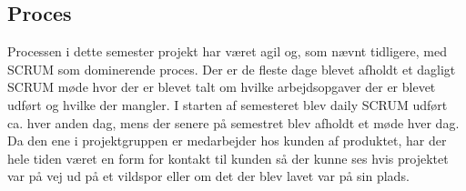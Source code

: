 \subsection{Proces}
Processen i dette semester projekt har været agil og, som nævnt tidligere, med SCRUM som dominerende proces.\newline
Der er de fleste dage blevet afholdt et dagligt SCRUM møde hvor der er blevet talt om hvilke arbejdsopgaver der er blevet udført og hvilke der mangler. I starten af semesteret blev daily SCRUM udført ca. hver anden dag, mens der senere på semestret blev afholdt et møde hver dag. \newline
Da den ene i projektgruppen er medarbejder hos kunden af produktet, har der hele tiden været en form for kontakt til kunden så der kunne ses hvis projektet var på vej ud på et vildspor eller om det der blev lavet var på sin plads. 


